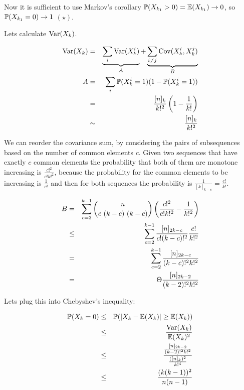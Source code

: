 \documentclass[a4paper]{article}
\begin{document}
Now it is sufficient to use Markov's corollary $ \P(X_{k_1} > 0) = \E(X_{k_1})
\to 0 $, so $ \P(X_{k_1} = 0) \to 1 $ $ (\star) $.

Lets calculate $ \Var(X_k) $.

\begin{eqnarray*}
\Var(X_k)
  &=& \underbrace{\sum_{i} \Var(X_k^i)}_{A} + \underbrace{\sum_{i\neq j} \Cov(X_k^i, X_k^j)}_B \\
A
  &=& \sum_{i} \P(X_k^i = 1)(1 - \P(X_k^i = 1)) \\
  &=& \frac{[n]_k}{k!^2}\B{1 - \frac{1}{k!}} \\
  &\sim& \frac{[n]_k}{k!^2} \\
\end{eqnarray*}

We can reorder the covariance sum, by considering the pairs of subsequences
based on the number of common elements $ c $. Given two sequences that have
exactly $ c $ common elements the probability that both of them are monotone
increasing is $ \frac{c!^2}{c!k!^2} $, because the probability for the common
elements to be increasing is $ \frac{1}{c!} $ and then for both sequences the
probability is $ \frac{1}{[k]_{k-c}} = \frac{c!}{k!} $.

\begin{eqnarray*}
B
  &=& \sum_{c = 2}^{k-1} \binom{n}{c\ (k-c)\ (k-c)}
                         \B{\frac{c!^2}{c!k!^2}
                            - \frac{1}{k!^2}} \\
  &\le& \sum_{c = 2}^{k-1} \frac{[n]_{2k-c}}{c!(k-c)!^2}
                           \frac{c!}{k!^2} \\
  &=& \sum_{c = 2}^{k-1} \frac{[n]_{2k-c}}{(k-c)!^2k!^2} \\
  &=& \Theta \frac{[n]_{2k-2}}{(k-2)!^2k!^2}
\end{eqnarray*}

Lets plug this into Chebyshev's inequality:

\begin{eqnarray*}
\P(X_k = 0)
  &\le& \P(|X_k - \E(X_k)| \ge \E(X_k)) \\ 
  &\le& \frac{\Var(X_k)}{\E(X_k)^2} \\
  &\le& \frac{
                \frac{[n]_{2k-2}}
                     {(k-2)!^2k!^2}
             }{
                \frac{{([n]_k)^2}}
                     {k!^4}
             } \\
  &\le& \frac{(k(k-1))^2}{n(n-1)} \\
\end{eqnarray*}
\end{document}

